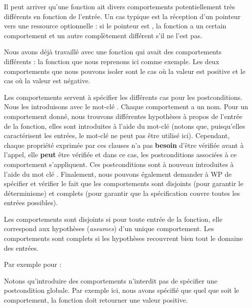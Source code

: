 Il peut arriver qu'une fonction ait divers comportements potentiellement très
différents en fonction de l'entrée. Un cas typique est la réception d'un
pointeur vers une ressource optionnelle : si le pointeur est ,
la fonction a un certain comportement et un autre complètement différent s'il ne
l'est pas.



Nous avons déjà travaillé avec une fonction qui avait des comportements différents :
la fonction  que nous reprenons ici comme exemple. Les deux
comportements que nous pouvons isoler sont le cas où la valeur est positive et
le cas où la valeur est négative.



Les comportements servent à spécifier les différents cas pour les
postconditions. Nous les introduisons avec le mot-clé .
Chaque comportement a un nom. Pour un comportement donné, nous trouvons
différentes hypothèses à propos de l'entrée de la fonction, elles sont
introduites à l'aide du mot-clé  (notons que, puisqu'elles
caractérisent les entrées, le mot-clé  ne peut
pas être utilisé ici). Cependant, chaque propriété exprimée par ces clauses
n'a pas \textbf{besoin} d'être vérifiée avant à l'appel, elle \textbf{peut}
être vérifiée et dans ce cas, les postconditions associées à ce comportement
s'appliquent. Ces postconditions sont à nouveau introduites à l'aide du mot
clé . Finalement, nous pouvons également demander à WP
de spécifier et vérifier le fait que les comportements sont disjoints (pour
garantir le déterminisme) et complets (pour garantir que la spécification couvre
toutes les entrées possibles).



Les comportements sont disjoints si pour toute entrée de la fonction, elle
correspond aux hypothèses (\textit{assumes}) d'un unique comportement. Les
comportements sont complets si les hypothèses recouvrent bien tout le domaine
des entrées.



Par exemple pour  :





Notons qu'introduire des comportements n'interdit pas de spécifier une
postcondition globale. Par exemple ici, nous avons spécifié que quel que soit
le comportement, la fonction doit retourner une valeur positive.


